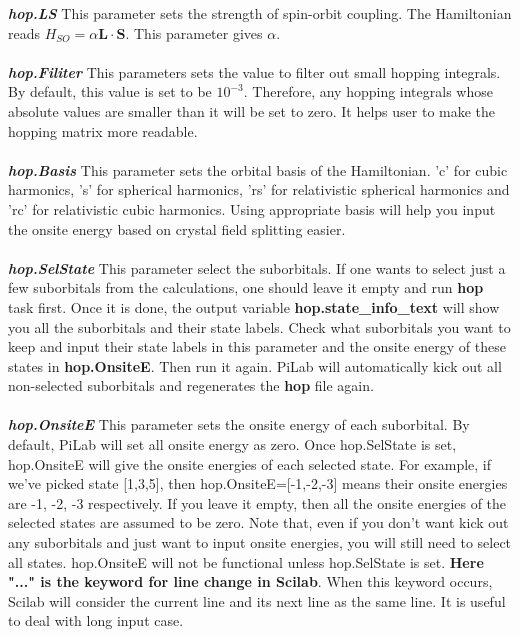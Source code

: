 \documentclass[10pt,a4paper]{article}
\begin{document}
\textit{\textbf{hop.LS}} This parameter sets the strength of spin-orbit coupling. The Hamiltonian reads $H_{SO}=\alpha \textbf{L} \cdot \textbf{S}$. This parameter gives $\alpha$.\\ \\
\textit{\textbf{hop.Filiter}} This parameters sets the value to filter out small hopping integrals. By default, this value is set to be $10^{-3}$. Therefore, any hopping integrals whose absolute values are smaller than it will be set to zero. It helps user to make the hopping matrix more readable. \\ \\  
\textit{\textbf{hop.Basis}} This parameter sets the orbital basis of the Hamiltonian. 'c' for cubic harmonics, 's' for spherical harmonics, 'rs' for relativistic spherical harmonics and 'rc' for relativistic cubic harmonics. Using appropriate basis will help you input the onsite energy based on crystal field splitting easier. \\ \\
\textit{\textbf{hop.SelState}} This parameter select the suborbitals. If one wants to select just a few suborbitals from the calculations, one should leave it empty and run \textbf{hop} task first. Once it is done, the output variable \textbf{hop.state\_info\_text} will show you all the suborbitals and their state labels. Check what suborbitals you want to keep and input their state labels in this parameter and the onsite energy of these states in \textbf{hop.OnsiteE}. Then run it again. PiLab will automatically kick out all non-selected suborbitals and regenerates the \textbf{hop} file again. \\ \\
\textit{\textbf{hop.OnsiteE}} This parameter sets the onsite energy of each suborbital. By default, PiLab will set all onsite energy as zero. Once hop.SelState is set, hop.OnsiteE will give the onsite energies of each selected state. For example, if we've picked state [1,3,5], then hop.OnsiteE=[-1,-2,-3] means their onsite energies are -1, -2, -3 respectively. If you leave it empty, then all the onsite energies of the selected states are assumed to be zero. Note that, even if you don't want kick out any suborbitals and just want to input onsite energies, you will still need to select all states. hop.OnsiteE will not be functional unless hop.SelState is set. \textbf{Here "..." is the keyword for line change in Scilab}. When this keyword occurs, Scilab will consider the current line and its next line as the same line. It is useful to deal with long input case.
\end{document}
